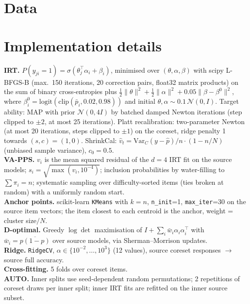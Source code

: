 \appendix
\section{Data}
\begin{table}[h]
\caption{Item-level matrices used (OLL: Open LLM Leaderboard v2; HELM). ``const.\ items'': items answered identically by all models. Accuracy statistics are over models.}
\label{tab:data}
\centering\scriptsize
\end{table}
\begin{table}[h]
\caption{Absolute RMSE (accuracy points; $\sqrt{\text{seed-averaged MSE}}$) at $n=100$ for random splits and stronger targets.}
\label{tab:abs}
\centering\tiny\setlength{\tabcolsep}{2pt}
\end{table}

\section{Implementation details}\label{app:impl}
\textbf{IRT.} $P(y_{ji}=1)=\sigma(\theta_j^\top\alpha_i+\beta_i)$, minimised over $(\theta,\alpha,\beta)$ with scipy L-BFGS-B (max.\ 150 iterations, 20 correction pairs, float32 matrix products) on the sum of binary cross-entropies plus $\frac12\|\theta\|^2+\frac12\|\alpha\|^2+0.05\|\beta-\beta^{0}\|^2$, where $\beta^{0}_i=\mathrm{logit}(\mathrm{clip}(\bar p_i,0.02,0.98))$ and initial $\theta,\alpha\sim 0.1\,\mathcal N(0,I)$. Target ability: MAP with prior $\mathcal N(0,4I)$ by batched damped Newton iterations (step clipped to $\pm2$, at most 25 iterations). Platt recalibration: two-parameter Newton (at most 20 iterations, steps clipped to $\pm1$) on the coreset, ridge penalty 1 towards $(s,c)=(1,0)$. ShrinkCal: $\hat v_t=\mathrm{Var}_C(y-\hat p)/n\cdot(1-n/N)$ (unbiased sample variance), $c_0=0.5$.\\
\textbf{VA-PPS.} $v_i$ is the mean squared residual of the $d=4$ IRT fit on the source models; $s_i=\sqrt{\max(v_i,10^{-4})}$; inclusion probabilities by water-filling to $\sum\pi_i=n$; systematic sampling over difficulty-sorted items (ties broken at random) with a uniformly random start.\\
\textbf{Anchor points.} scikit-learn \texttt{KMeans} with $k=n$, \texttt{n\_init}=1, \texttt{max\_iter}=30 on the source item vectors; the item closest to each centroid is the anchor, weight = cluster size$/N$.\\
\textbf{D-optimal.} Greedy $\log\det$ maximisation of $I+\sum_i \bar w_i\alpha_i\alpha_i^\top$ with $\bar w_i=\overline{p(1-p)}$ over source models, via Sherman--Morrison updates.\\
\textbf{Ridge.} \texttt{RidgeCV}, $\alpha\in\{10^{-2},\dots,10^{3}\}$ (12 values), source coreset responses $\to$ source full accuracy.\\
\textbf{Cross-fitting.} 5 folds over coreset items.\\
\textbf{AUTO.} Inner splits use seed-dependent random permutations; 2 repetitions of coreset draws per inner split; inner IRT fits are refitted on the inner source subset.

